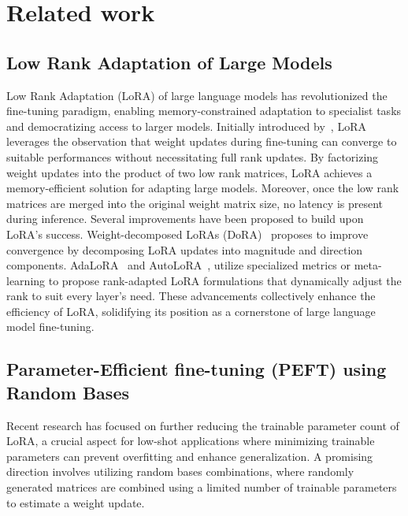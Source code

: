 \section{Related work\label{sec:related}
}

\subsection{Low Rank Adaptation of Large Models}

Low Rank Adaptation (LoRA) of large language models has revolutionized the fine-tuning paradigm, enabling memory-constrained adaptation to specialist tasks and democratizing access to larger models. Initially introduced by~\citep{2022_ICLR_lora}, LoRA leverages the observation that weight updates during fine-tuning can converge to suitable performances without necessitating full rank updates. By factorizing weight updates into the product of two low rank matrices, LoRA achieves a memory-efficient solution for adapting large models. Moreover, once the low rank matrices are merged into the original weight matrix size, no latency is present during inference.
Several improvements have been proposed to build upon LoRA's success. Weight-decomposed LoRAs (DoRA)~\citep{2024_ICML_DoRA} proposes to improve convergence by decomposing LoRA updates into magnitude and direction components. AdaLoRA~\citep{2023_ICLR_AdaLoRA} and AutoLoRA~\citep{2024_arxiv_autolora}, utilize specialized metrics or meta-learning to propose rank-adapted LoRA formulations that dynamically adjust the rank to suit every layer's need. 
These advancements collectively enhance the efficiency of LoRA, solidifying its position as a cornerstone of large language model fine-tuning.

\subsection{Parameter-Efficient fine-tuning (PEFT) using Random Bases}
Recent research has focused on further reducing the trainable parameter count of LoRA, a crucial aspect for low-shot applications where minimizing trainable parameters can prevent overfitting and enhance generalization. A promising direction involves utilizing random bases combinations, where randomly generated matrices are combined using a limited number of trainable parameters to estimate a weight update.

